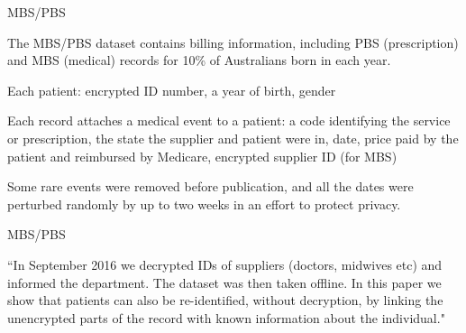 \documentclass[12pt,aspectratio=169,handout]{beamer}
\begin{document}
\begin{frame}{MBS/PBS}

The MBS/PBS dataset contains billing information, including PBS (prescription) and MBS (medical) records for 10\% of Australians born in each year.

Each patient: encrypted ID number, a year of birth, gender

Each record attaches a medical event to a patient: a code identifying the service or prescription, the state the supplier and patient were in, date, price paid by the patient and reimbursed by Medicare, encrypted supplier ID (for MBS)

Some rare events were removed before publication, and all the dates were perturbed randomly by up to two weeks in an effort to protect privacy.


\end{frame}



\begin{frame}{MBS/PBS}

``In September 2016 we decrypted IDs of suppliers (doctors, midwives etc) and informed the department. The dataset was then taken offline. In this paper we show that patients can also be re-identified, without decryption, by linking the unencrypted parts of the record with known information about the individual." \citep{Culnane.et.al.2017.arXiv}


\end{frame}
\end{document}
